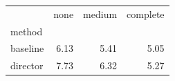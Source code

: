 \begin{tabular}{lrrr}
\toprule
 & none & medium & complete \\
method &  &  &  \\
\midrule
baseline & 6.13 & 5.41 & 5.05 \\
director & 7.73 & 6.32 & 5.27 \\
\bottomrule
\end{tabular}
